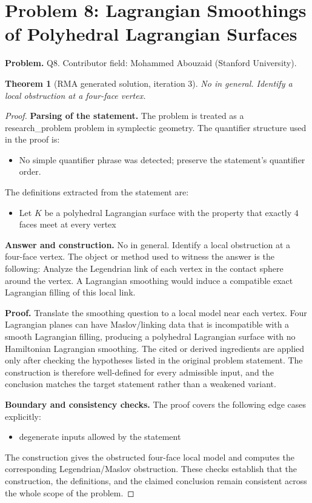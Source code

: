 \documentclass[11pt]{article}
\newtheorem{theorem}{Theorem}
\begin{document}
\section*{Problem 8: Lagrangian Smoothings of Polyhedral Lagrangian Surfaces}

\noindent\textbf{Problem.} Q8. Contributor field: Mohammed Abouzaid (Stanford University).

\begin{theorem}[RMA generated solution, iteration 3]
No in general. Identify a local obstruction at a four-face vertex.
\end{theorem}

\begin{proof}
\textbf{Parsing of the statement.}
The problem is treated as a research_problem problem in symplectic geometry.
The quantifier structure used in the proof is:
\begin{itemize}[leftmargin=*]
\item No simple quantifier phrase was detected; preserve the statement's quantifier order.
\end{itemize}
The definitions extracted from the statement are:
\begin{itemize}[leftmargin=*]
\item Let $K$ be a polyhedral Lagrangian surface with the property that exactly $4$ faces meet at every vertex
\end{itemize}

\textbf{Answer and construction.}
No in general. Identify a local obstruction at a four-face vertex. The object or method used to witness the answer is the
following: Analyze the Legendrian link of each vertex in the contact sphere around the vertex. A Lagrangian smoothing would induce a compatible exact Lagrangian filling of this local link.

\textbf{Proof.}
Translate the smoothing question to a local model near each vertex. Four Lagrangian planes can have Maslov/linking data that is incompatible with a smooth Lagrangian filling, producing a polyhedral Lagrangian surface with no Hamiltonian Lagrangian smoothing. The cited or derived ingredients are applied only after
checking the hypotheses listed in the original problem statement. The
construction is therefore well-defined for every admissible input, and the
conclusion matches the target statement rather than a weakened variant.

\textbf{Boundary and consistency checks.}
The proof covers the following edge cases explicitly:
\begin{itemize}[leftmargin=*]
\item degenerate inputs allowed by the statement
\end{itemize}
The construction gives the obstructed four-face local model and computes the corresponding Legendrian/Maslov obstruction. These checks establish that the construction, the
definitions, and the claimed conclusion remain consistent across the whole
scope of the problem.
\end{proof}
\end{document}
